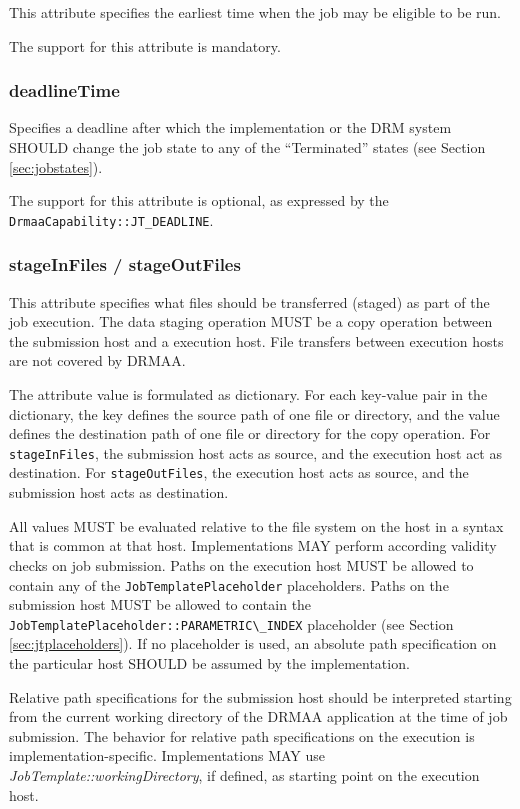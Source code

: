 \documentclass{article}
\newcommand{\h}[1]{\lstinline|#1|}
\begin{document}
This attribute specifies the earliest time when the job may be eligible to be run. 

The support for this attribute is mandatory.

\subsubsection{deadlineTime}

Specifies a deadline after which the implementation or the DRM system SHOULD change the job state to any of the \enquote{Terminated} states (see Section \ref{sec:jobstates}).

The support for this attribute is optional, as expressed by the \h{DrmaaCapability::JT_DEADLINE}.

\subsubsection{stageInFiles / stageOutFiles}

This attribute specifies what files should be transferred (staged) as part of the job execution. The data staging operation MUST be a copy operation between the submission host and a execution host. File transfers between execution hosts are not covered by DRMAA.

The attribute value is formulated as dictionary. For each key-value pair in the dictionary, the key defines the source path of one file or directory, and the value defines the destination path of one file or directory for the copy operation. For \h{stageInFiles}, the submission host acts as source, and the execution host act as destination.  For \h{stageOutFiles}, the execution host acts as source, and the submission host acts as destination. 

All values MUST be evaluated relative to the file system on the host in a syntax that is common at that host. Implementations MAY perform according validity checks on job submission. Paths on the execution host MUST be allowed to contain any of the \h{JobTemplatePlaceholder} placeholders. Paths on the submission host MUST be allowed to contain the \h{JobTemplatePlaceholder::PARAMETRIC\_INDEX} placeholder (see Section \ref{sec:jtplaceholders}). If no placeholder is used, an absolute path specification on the particular host SHOULD be assumed by the implementation. 

Relative path specifications for the submission host should be interpreted starting from the current working directory of the DRMAA application at the time of job submission. The behavior for relative path specifications on the execution is implementation-specific. Implementations MAY use \emph{JobTemplate::workingDirectory}, if defined, as starting point on the execution host.
\end{document}
